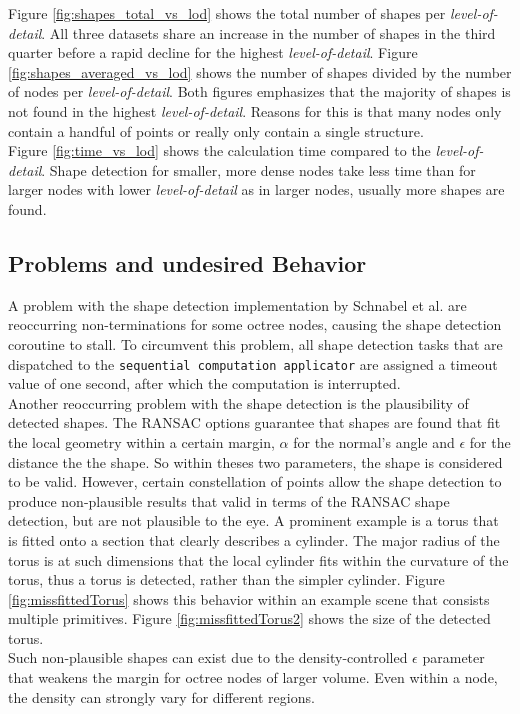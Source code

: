 Figure \ref{fig:shapes_total_vs_lod} shows the total number of shapes per \textit{level-of-detail}. All three datasets share an increase in the number of shapes in the third quarter before a rapid decline for the highest \textit{level-of-detail}. Figure \ref{fig:shapes_averaged_vs_lod} shows the number of shapes divided by the number of nodes per \textit{level-of-detail}. Both figures emphasizes that the majority of shapes is not found in the highest \textit{level-of-detail}. Reasons for this is that many nodes only contain a handful of points or really only contain a single structure. 
\\

Figure \ref{fig:time_vs_lod} shows the calculation time compared to the \textit{level-of-detail}. Shape detection for smaller, more dense nodes take less time than for larger nodes with lower \textit{level-of-detail} as in larger nodes, usually more shapes are found. 


\subsection{Problems and undesired Behavior}

A problem with the shape detection implementation by Schnabel et al.\cite{schnabel-2007-software} are reoccurring non-terminations for some octree nodes, causing the shape detection coroutine to stall. To circumvent this problem, all shape detection tasks that are dispatched to the \verb|sequential computation applicator| are assigned a timeout value of one second, after which the computation is interrupted. 
\\
Another reoccurring problem with the shape detection is the plausibility of detected shapes. The RANSAC options guarantee that shapes are found that fit the local geometry within a certain margin, $\alpha$ for the normal's angle and $\epsilon$ for the distance the the shape. So within theses two parameters, the shape is considered to be valid. However, certain constellation of points allow the shape detection to produce non-plausible results that valid in terms of the RANSAC shape detection, but are not plausible to the eye. A prominent example is a torus that is fitted onto a section that clearly describes a cylinder. The major radius of the torus is at such dimensions that the local cylinder fits within the curvature of the torus, thus a torus is detected, rather than the simpler cylinder. Figure \ref{fig:missfittedTorus} shows this behavior within an example scene that consists multiple primitives. Figure \ref{fig:missfittedTorus2} shows the size of the detected torus. 
\\
Such non-plausible shapes can exist due to the density-controlled $\epsilon$ parameter that weakens the margin for octree nodes of larger volume. Even within a node, the density can strongly vary for different regions. 

